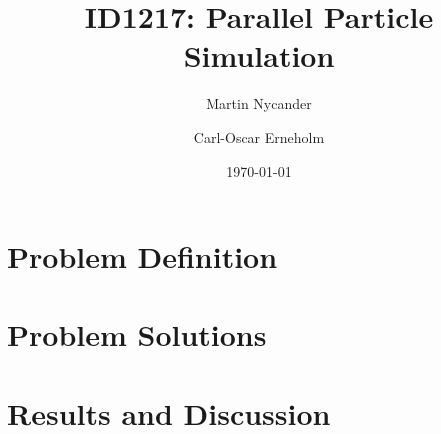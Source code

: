 \documentclass[titlepage,a4paper,10pt]{article}
\title{ID1217: Parallel Particle Simulation}
\author{Martin Nycander \and Carl-Oscar Erneholm}
\date{\today}
\begin{document}
\maketitle

\thispagestyle{empty}
\tableofcontents
\newpage

\setcounter{page}{1}

\newpage
\section{Problem Definition}



\newpage
\section{Problem Solutions}



\newpage
\section{Results and Discussion}


\end{document}
